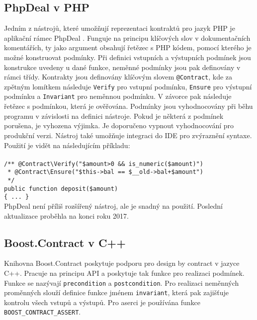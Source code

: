 		\subsection{PhpDeal v PHP}
			Jedním z nástrojů, které umožňují reprezentaci kontraktů pro jazyk PHP je aplikační rámec PhpDeal \cite{phpDeal}. Funguje na principu klíčových slov v dokumentačních komentářích, ty jako argument obsahují řetězec s PHP kódem, pomocí kterého je možné konstruovat podmínky. Při definici vstupních a výstupních podmínek jsou konstrukce uvedeny u dané funkce, neměnné podmínky jsou pak definovány v rámci třídy. Kontrakty jsou definovány klíčovým slovem \texttt{@Contract}, kde za zpětným lomítkem následuje \texttt{Verify} pro vstupní podmínku, \texttt{Ensure} pro výstupní podmínku a \texttt{Invariant} pro neměnnou podmínku. V závorce pak následuje řetězec s podmínkou, která je ověřována. Podmínky jsou vyhodnocovány při běhu programu v závislosti na definici nástroje. Pokud je některá z podmínek porušena, je vyhozena výjimka. Je doporučeno vypnout vyhodnocování pro produkční verzi. Nástroj také umožňuje integraci do IDE pro zvýraznění syntaxe. Použití je vidět na následujícím příkladu:\\\\
			\- \- \- \- \- \texttt{/** @Contract\textbackslash Verify("\$amount\textgreater 0 \&\& is\_numeric(\$amount)")}\\	
			\- \- \- \- \- \texttt{ * @Contract\textbackslash Ensure("\$this-\textgreater bal == \$\_\_old-\textgreater bal+\$amount")}\\
			\- \- \- \- \- \texttt{ */}\\
			\- \- \- \- \- \texttt{public function deposit(\$amount)}\\
			\- \- \- \- \- \texttt{\{ ... \}} \\
			
			PhpDeal není příliš rozšířený nástroj, ale je snadný na použití. Poslední aktualizace proběhla na konci roku 2017. 
		
		\subsection{Boost.Contract v C++}
			Knihovna Boost.Contract \cite{boostContract} poskytuje podporu pro design by contract v jazyce C++. Pracuje na principu API a poskytuje tak funkce pro realizaci podmínek. Funkce se nazývají \texttt{precondition} a \texttt{postcondition}. Pro realizaci neměnných proměnných slouží definice funkce jménem \texttt{invariant}, která pak zajišťuje kontrolu všech vstupů a výstupů. Pro aserci je používána funkce \texttt{BOOST\_CONTRACT\_ASSERT}.
			
